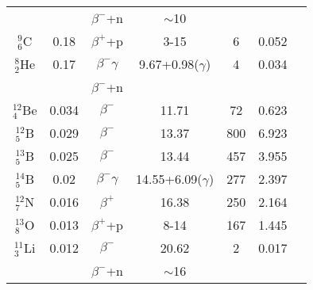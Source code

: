 \begin{table}[htbp]
\begin{tabular}{ccccccc}
		              &          & $\beta^{-}$+n     & $\sim$10                                                                             \\
		\addlinespace
		$^{9}_{6}$C   & 0.18     & $\beta^{+}$+p     & 3-15                 & 6         & 0.052                                             \\
		\addlinespace
		$^{8}_{2}$He  & 0.17     & $\beta^{-}\gamma$ & 9.67+0.98($\gamma$)  & 4         & 0.034                                             \\
		              &          & $\beta^{-}$+n     &                                                                                      \\
		\addlinespace
		$^{12}_{4}$Be & 0.034    & $\beta^{-}$       & 11.71                & 72        & 0.623                                             \\
		\addlinespace
		$^{12}_{5}$B  & 0.029    & $\beta^{-}$       & 13.37                & 800       & 6.923                                             \\
		\addlinespace
		$^{13}_{5}$B  & 0.025    & $\beta^{-}$       & 13.44                & 457       & 3.955                                             \\
		\addlinespace
		$^{14}_{5}$B  & 0.02     & $\beta^{-}\gamma$ & 14.55+6.09($\gamma$) & 277       & 2.397                                             \\
		\addlinespace
		$^{12}_{7}$N  & 0.016    & $\beta^{+}$       & 16.38                & 250       & 2.164                                             \\
		\addlinespace
		$^{13}_{8}$O  & 0.013    & $\beta^{+}$+p     & 8-14                 & 167       & 1.445                                             \\
		\addlinespace
		$^{11}_{3}$Li & 0.012    & $\beta^{-}$       & 20.62                & 2         & 0.017                                             \\
		              &          & $\beta^{-}$+n     & $\sim$16                                                                             \\
		\bottomrule
	\end{tabular}
\end{table}


